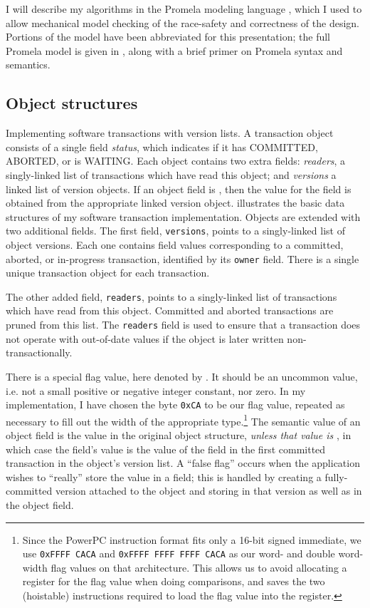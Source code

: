 I will describe my algorithms in the Promela modeling language
\cite{Holzmann03},
which I used to allow mechanical model checking of the race-safety
and correctness of the design.  Portions of the model have been
abbreviated for this presentation;  the full Promela model is
given in , along with a brief primer on Promela
syntax and semantics.

\subsection{Object structures}%
%
 {Implementing software transactions with version
  lists.  A transaction object consists of a single field {\it
    status}, which indicates if it has COMMITTED, ABORTED, or is WAITING.
  Each object contains two extra fields: {\it readers}, a
  singly-linked list of transactions which have read this object; and
  {\it versions} a linked list of version objects.  If an object field
  is \FLAG, then the value for the field is obtained from the
  appropriate linked version object.}
 illustrates the basic data structures of my
software transaction implementation.  Objects are extended with two
additional fields.  The first field, {\tt versions}, points to a
singly-linked list of object versions.  Each one contains field values
corresponding to a committed, aborted, or in-progress transaction,
identified by its {\tt owner} field.  There is a single unique
transaction object for each transaction.

The other added field, {\tt readers}, points to a singly-linked list
of transactions which have read from this object.  Committed and
aborted transactions are pruned from this list.  The {\tt readers}
field is used to ensure that a transaction does not operate with
out-of-date values if the object is later written
non-transactionally.

There is a special flag value, here denoted by \FLAG.  It should be
an uncommon value, i.e. not a small positive or negative integer
constant, nor zero.  In my implementation, I have chosen the byte
\texttt{0xCA} to be our flag value, repeated as necessary to fill out
the width of the appropriate type.\footnote{Since the PowerPC instruction
format fits only a 16-bit signed immediate, we use \texttt{0xFFFF CACA}
and \texttt{0xFFFF FFFF FFFF CACA} as our word- and double word-width flag
values on that architecture.  This allows us to avoid allocating a
register for the flag value when doing comparisons, and saves the two
(hoistable) instructions required to load the flag value into the register.}
The semantic value of an object field is the value in the original
object structure, \emph{unless that value is \FLAG}, in which
case the field's value is the value of the field in the first
committed transaction in the object's version list.  A ``false flag''
occurs when the application wishes to ``really'' store the value \FLAG
in a field; this is handled by creating a fully-committed version
attached to the object and storing \FLAG in that version as well as in
the object field.

